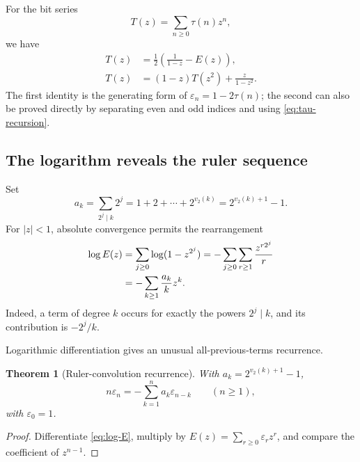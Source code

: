 \documentclass[11pt,oneside]{article}
\newtheorem{theorem}{Theorem}[section]
\theoremstyle{definition}
\theoremstyle{remark}
\newcommand{\vtwo}{v_2}
\newcommand{\eps}{\varepsilon}
\begin{document}
For the bit series
\begin{equation}
  T(z)=\sum_{n\ge0}\tau(n)z^n,                             \label{eq:T-definition}
\end{equation}
we have
\begin{align}
  T(z)&=\frac12\left(\frac1{1-z}-E(z)\right),              \label{eq:T-from-E}\\
  T(z)&=(1-z)T(z^2)+\frac{z}{1-z^2}.                       \label{eq:T-Mahler}
\end{align}
The first identity is the generating form of \(\eps_n=1-2\tau(n)\); the second can also be
proved directly by separating even and odd indices and using \eqref{eq:tau-recursion}.

\subsection{The logarithm reveals the ruler sequence}

Set
\begin{equation}
  a_k=\sum_{2^j\mid k}2^j=1+2+\cdots+2^{\vtwo(k)}
     =2^{\vtwo(k)+1}-1.                                    \label{eq:ak-ruler}
\end{equation}
For \(|z|<1\), absolute convergence permits the rearrangement
\begin{align}
  \log E(z)
  &=\sum_{j\ge0}\log(1-z^{2^j})
    =-\sum_{j\ge0}\sum_{r\ge1}\frac{z^{r2^j}}r            \notag\\
  &=-\sum_{k\ge1}\frac{a_k}{k}z^k.                        \label{eq:log-E}
\end{align}
Indeed, a term of degree \(k\) occurs for exactly the powers \(2^j\mid k\), and its
contribution is \(-2^j/k\).

Logarithmic differentiation gives an unusual all-previous-terms recurrence.

\begin{theorem}[Ruler-convolution recurrence]
\label{thm:ruler-convolution}
With \(a_k=2^{\vtwo(k)+1}-1\),
\begin{equation}
  \boxed{
  n\eps_n=-\sum_{k=1}^{n}a_k\eps_{n-k}\qquad(n\ge1),}      \label{eq:ruler-convolution}
\end{equation}
with \(\eps_0=1\).
\end{theorem}

\begin{proof}
Differentiate \eqref{eq:log-E}, multiply by
\(E(z)=\sum_{r\ge0}\eps_rz^r\), and compare the coefficient of \(z^{n-1}\).
\end{proof}
\end{document}

